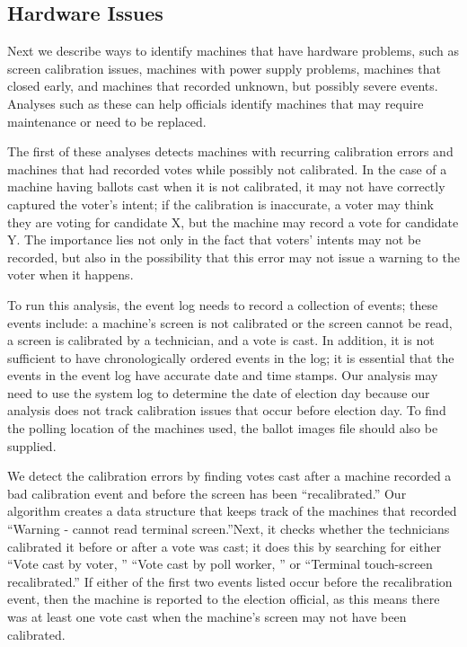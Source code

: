 \subsection{Hardware Issues}
\smvertspace
Next we describe ways to identify machines that have hardware problems, such as
screen calibration issues, machines with power supply problems, machines that
closed early, and machines that recorded unknown, but possibly severe events.
Analyses such as these can help officials identify machines that may require
maintenance or need to be replaced.  

The first of these analyses detects machines with recurring calibration errors
and machines that had recorded votes while possibly not calibrated.  In the case
of a machine having ballots cast when it is not calibrated, it may not have
correctly captured the voter's intent; if the calibration is inaccurate, a voter
may think they are voting for candidate X, but the machine may record a vote for
candidate Y.  The importance lies not only in the fact that voters' intents may
not be recorded, but also in the possibility that this error may not issue a
warning to the voter when it happens.   

To run this analysis, the event log needs to record a collection of
events; these events include: a machine's screen is not calibrated or
the screen cannot be read, a screen is calibrated by a technician, and
a vote is cast.  In addition, it is not sufficient to have
chronologically ordered events in the log; it is essential that the
events in the event log have accurate date and time stamps.  Our
analysis may need to use the system log to determine the date of
election day because our analysis does not track calibration issues
that occur before election day.  To find the polling location of the
machines used, the ballot images file should also be supplied.  

We detect the calibration errors by finding votes cast after a machine
recorded a bad calibration event and before the screen has been
\textquotedblleft recalibrated.\textquotedblright \hspace{2 mm}  Our
algorithm creates a data structure that keeps track of the machines
that recorded \textquotedblleft Warning - cannot read terminal
screen.\textquotedblright \hspace{2 mm}Next, it checks whether the
technicians calibrated it before or after a vote was cast; it does
this by searching for either \textquotedblleft Vote cast by voter,
\textquotedblright \hspace{1 mm} \textquotedblleft Vote cast by poll
worker, \textquotedblright \hspace{1 mm} or \textquotedblleft Terminal
touch-screen recalibrated.\textquotedblright \hspace{2 mm} If either
of the first two events listed occur before the recalibration event,
then the machine is reported to the election official, as this means
there was at least one vote cast when the machine's screen may not
have been calibrated.  

